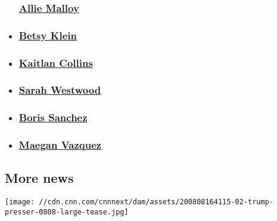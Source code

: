 \begin{itemize}
{  \subsubsection{\texorpdfstring{\href{/profiles/allie-malloy}{Allie
  Malloy}}{Allie Malloy}}\label{allie-malloy}}
\item
  \hypertarget{betsy-klein}{%
  \subsubsection{\texorpdfstring{\href{/profiles/betsy-klein}{Betsy
  Klein}}{Betsy Klein}}\label{betsy-klein}}
\item
  \hypertarget{kaitlan-collins}{%
  \subsubsection{\texorpdfstring{\href{/profiles/kaitlan-collins}{Kaitlan
  Collins}}{Kaitlan Collins}}\label{kaitlan-collins}}
\item
  \hypertarget{sarah-westwood}{%
  \subsubsection{\texorpdfstring{\href{/profiles/sarah-westwood}{Sarah
  Westwood}}{Sarah Westwood}}\label{sarah-westwood}}
\item
  \hypertarget{boris-sanchez}{%
  \subsubsection{\texorpdfstring{\href{/profiles/boris-sanchez-profile}{Boris
  Sanchez}}{Boris Sanchez}}\label{boris-sanchez}}
\item
  \hypertarget{maegan-vazquez}{%
  \subsubsection{\texorpdfstring{\href{/profiles/maegan-vazquez}{Maegan
  Vazquez}}{Maegan Vazquez}}\label{maegan-vazquez}}
\end{itemize}

\hypertarget{more-news-}{%
\subsection{More news~}\label{more-news-}}

\href{/2020/08/08/politics/fact-check-trump-covid-executive-actions-bedminster/index.html}{}

\texttt{[image: //cdn.cnn.com/cnnnext/dam/assets/200808164115-02-trump-presser-0808-large-tease.jpg]}

